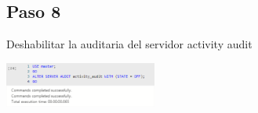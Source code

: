 \documentclass[twoside,twocolumn]{article}
\begin{document}
\subsection{Paso 8}
Deshabilitar la auditaria del servidor activity audit
\begin{center}
	\includegraphics[width=5cm]{./Imagenes/8} 
\end{center}


\end{document}
